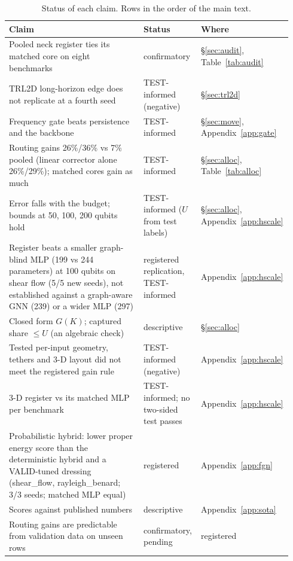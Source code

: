 \documentclass{article}
\begin{document}
\begin{table}[h]
\centering
\caption{Status of each claim. Rows in the order of the main text.}
\label{tab:claims}
\footnotesize
\setlength{\tabcolsep}{3pt}
\begin{tabular}{p{0.47\linewidth}p{0.2\linewidth}p{0.27\linewidth}}
\toprule
Claim & Status & Where \\
\midrule
Pooled neck register ties its matched core on eight benchmarks & confirmatory & \S\ref{sec:audit}, Table~\ref{tab:audit} \\
TRL2D long-horizon edge does not replicate at a fourth seed & TEST-informed (negative) & \S\ref{sec:trl2d} \\
Frequency gate beats persistence and the backbone & TEST-informed & \S\ref{sec:move}, Appendix~\ref{app:gate} \\
Routing gains 26\%/36\% vs 7\% pooled (linear corrector alone 26\%/29\%); matched cores gain as much & TEST-informed & \S\ref{sec:alloc}, Table~\ref{tab:alloc} \\
Error falls with the budget; bounds at 50, 100, 200 qubits hold & TEST-informed ($U$ from test labels) & \S\ref{sec:alloc}, Appendix~\ref{app:hscale} \\
Register beats a smaller graph-blind MLP (199 vs 244 parameters) at 100 qubits on shear flow (5/5 new seeds), not established against a graph-aware GNN (239) or a wider MLP (297) & registered replication, TEST-informed & Appendix~\ref{app:hscale} \\
Closed form $G(K)$; captured share $\le U$ (an algebraic check) & descriptive & \S\ref{sec:alloc} \\
Tested per-input geometry, tethers and 3-D layout did not meet the registered gain rule & TEST-informed (negative) & Appendix~\ref{app:hscale} \\
3-D register vs its matched MLP per benchmark & TEST-informed; no two-sided test passes & Appendix~\ref{app:hscale} \\
Probabilistic hybrid: lower proper energy score than the deterministic hybrid and a VALID-tuned dressing (shear\_flow, rayleigh\_benard; 3/3 seeds; matched MLP equal) & registered & Appendix~\ref{app:fgn} \\
Scores against published numbers & descriptive & Appendix~\ref{app:sota} \\
Routing gains are predictable from validation data on unseen rows & confirmatory, pending & registered \\
\bottomrule
\end{tabular}
\end{table}
\end{document}
